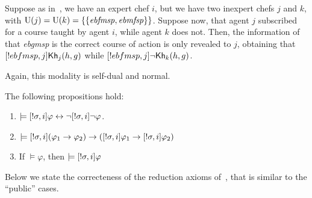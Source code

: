 \medskip 

\begin{example}
Suppose as in~, we have an expert chef $i$, but we have two inexpert chefs $j$ and $k$, with $\operatorname{U}(j)=\operatorname{U}(k)=\{ \{ \mathit{ebfmsp},\mathit{ebmfsp} \} \}$. Suppose now, that agent $j$ subscribed for a course taught by agent $i$, while agent $k$ does not. Then, the information of that \textit{ebgmsp} is the correct course of action is only revealed to $j$, obtaining that $[!ebfmsp,j]{\sf Kh}_j(h,g)$ while $[!ebfmsp,j]\neg{\sf Kh}_k(h,g)$.
\end{example}

Again, this modality is self-dual and normal.

\medskip 

\begin{proposition} The following propositions hold:
\begin{enumerate}
\item $\models [!\sigma,i]\varphi \leftrightarrow \neg[!\sigma,i]\neg\varphi$. 
\item $\models [!\sigma,i](\varphi_1 \rightarrow \varphi_2) \rightarrow ([!\sigma,i]\varphi_1 \rightarrow [!\sigma,i]\varphi_2)$
\item If $\models \varphi$, then $\models [!\sigma,i]\varphi$
\end{enumerate}
\end{proposition}

\medskip 

Below we state the correcteness of the reduction axioms of~, that is similar to the ``public'' cases. 

\medskip 

